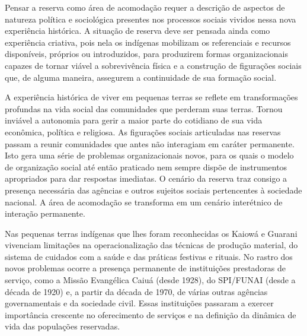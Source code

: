 Pensar a reserva como área de acomodação requer a descrição de aspectos
de natureza política e sociológica presentes nos processos sociais
vividos nessa nova experiência histórica. A situação de reserva deve
ser pensada ainda como experiência criativa, pois nela os indígenas
mobilizam os referenciais e recursos disponíveis, próprios ou
introduzidos, para produzirem formas organizacionais capazes de tornar
viável a sobrevivência física e a construção de figurações sociais que,
de alguma maneira, assegurem a continuidade de sua formação social. 

A experiência histórica de viver em pequenas terras se reflete em
transformações profundas na vida social das comunidades que perderam
suas terras. Tornou inviável a autonomia para gerir a maior parte do
cotidiano de sua vida econômica, política e religiosa. As figurações
sociais articuladas nas reservas passam a reunir comunidades que antes
não interagiam em caráter permanente. Isto gera uma série de problemas
organizacionais novos, para os quais o modelo de organização social até
então praticado nem sempre dispõe de instrumentos apropriados para dar
respostas imediatas. O cenário da reserva traz consigo a presença necessária das
agências e outros sujeitos sociais pertencentes à sociedade nacional. A
área de acomodação se transforma em um cenário interétnico de interação
permanente.

Nas pequenas terras indígenas que lhes foram reconhecidas os Kaiowá e
Guarani vivenciam limitações na operacionalização das técnicas de
produção material, do sistema de cuidados com a saúde e das práticas
festivas e rituais. No rastro dos novos problemas ocorre a presença
permanente de instituições prestadoras de serviço, como a Missão
Evangélica Caiuá (desde 1928), do SPI/FUNAI (desde a década de 1920) e,
a partir da década de 1970, de várias outras agências governamentais e
da sociedade civil. Essas instituições passaram a exercer importância
crescente no oferecimento de serviços e na definição da dinâmica de
vida das populações reservadas.

